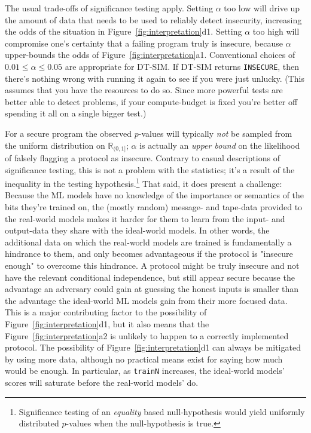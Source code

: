 \documentclass[acmlarge, manuscript, screen, review, anonymous, table]{acmart}
\newcommand{\toolname}{\textsc{DT-SIM}\xspace}
\begin{document}
The usual trade-offs of significance testing apply.
Setting $\alpha$ too low will drive up the amount of data that needs to be used to reliably detect insecurity,
increasing the odds of the situation in Figure~\ref{fig:interpretation}d1.
Setting $\alpha$ too high will compromise one's certainty that a failing program truly is insecure,
because $\alpha$ upper-bounds the odds of Figure~\ref{fig:interpretation}a1.
Conventional choices of $0.01 \le \alpha \le 0.05$ are appropriate for \toolname.
If \toolname returns \texttt{INSECURE},
then there's nothing wrong with running it again to see if you were just unlucky.
(This assumes that you have the resources to do so.
Since more powerful tests are better able to detect problems,
if your compute-budget is fixed you're better off spending it all on a single bigger test.)

For a secure program the observed $p$-values
will typically \emph{not} be sampled from the uniform distribution on $\mathbb{R}_{(0,1]}$;
$\alpha$ is actually an \emph{upper bound} on the likelihood of falsely flagging a protocol as insecure.
Contrary to casual descriptions of significance testing, this is not a problem with the statistics;
it's a result of the inequality in the testing hypothesis.\footnote{
    Significance testing of an \emph{equality} based null-hypothesis would yield uniformly distributed $p$-values when the null-hypothesis is true.
}
That said, it does present a challenge:
Because the ML models have no knowledge of the importance or semantics of the bits they're trained on,
the (mostly random) message- and tape-data provided to the real-world models makes it harder for them
to learn from the input- and output-data they share with the ideal-world models.
In other words, the additional data on which the real-world models are trained is fundamentally a hindrance to them,
and only becomes advantageous if the protocol is "insecure enough" to overcome this hindrance.
A protocol might be truly insecure and not have the relevant conditional independence,
but still appear secure because the advantage an adversary could gain at guessing the honest inputs
is smaller than the advantage the ideal-world ML models gain from their more focused data.
This is a major contributing factor to the possibility of Figure~\ref{fig:interpretation}d1,
but it also means that the Figure~\ref{fig:interpretation}a2 is unlikely to happen to a correctly implemented protocol.
The possibility of Figure~\ref{fig:interpretation}d1 can always be mitigated by using more data,
although no practical means exist for saying how much would be enough.
In particular, as \texttt{trainN} increases,
the ideal-world models' scores will saturate before the real-world models' do.
\end{document}

